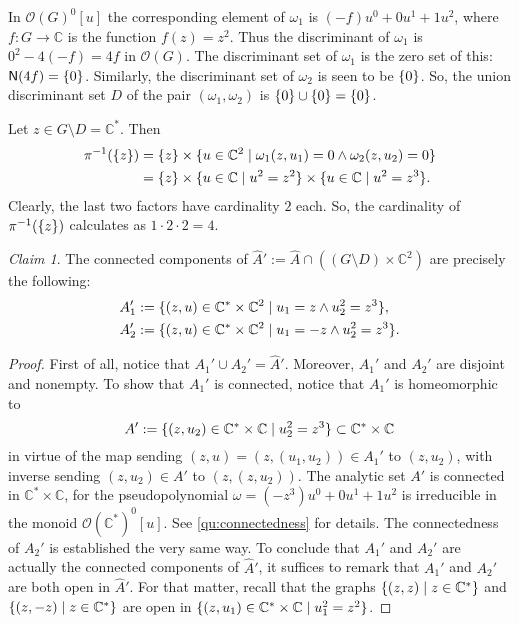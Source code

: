 \documentclass[a4paper]{amsart}
\newcommand{\C}{\mathbb{C}}
\newcommand{\Zero}[1]{\mathsf{N}(#1)}
\renewcommand{\O}{\mathcal{O}}
\theoremstyle{remark}
\newtheorem{claim}{Claim}[question]
\numberwithin{equation}{question}
\DeclarePairedDelimiter\set{\{}{\}}
\begin{document}
\begin{solution}%
\begin{solenum}
\item In $\O(G)^0[u]$ the corresponding element of $\omega_1$ is $(-f)u^0 + 0u^1 + 1u^2$, where $f \colon G \to \C$ is the function $f(z) = z^2$. Thus the discriminant of $\omega_1$ is $0^2 - 4(-f) = 4f$ in $\O(G)$. The discriminant set of $\omega_1$ is the zero set of this: $\Zero{4f} = \set0$. Similarly, the discriminant set of $\omega_2$ is seen to be $\set0$. So, the union discriminant set $D$ of the pair $(\omega_1,\omega_2)$ is $\set0 \cup \set0 = \set0$.

\item Let $z \in G \setminus D = \C^*$. Then
\begin{align*}
\pi^{-1}(\set z) &= \set z \times \set{u \in \C^2 \mid \omega_1(z,u_1) = 0 \land \omega_2(z,u_2) = 0} \\
&= \set z \times \set{u \in \C \mid u^2 = z^2} \times \set{u \in \C \mid u^2 = z^3}.
\end{align*}
Clearly, the last two factors have cardinality $2$ each. So, the cardinality of $\pi^{-1}(\set z)$ calculates as $1 \cdot 2 \cdot 2 = 4$.

\item \begin{claim} The connected components of $\hat A' := \hat A \cap ((G \setminus D) \times \C^2)$ are precisely the following:
\begin{align*}
A_1' &:= \set{(z,u) \in \C^* \times \C^2 \mid u_1 = z \land u_2^2 = z^3}, \\
A_2' &:= \set{(z,u) \in \C^* \times \C^2 \mid u_1 = -z \land u_2^2 = z^3}.
\end{align*}\end{claim}

\begin{proof}
First of all, notice that $A_1' \cup A_2' = \hat A'$. Moreover, $A_1'$ and $A_2'$ are disjoint and nonempty. To show that $A_1'$ is connected, notice that $A_1'$ is homeomorphic to
\[
A' := \set{(z,u_2) \in \C^* \times \C \mid u_2^2 = z^3} \subset \C^* \times \C
\]
in virtue of the map sending $(z,u) = (z,(u_1,u_2)) \in A_1'$ to $(z,u_2)$, with inverse sending $(z,u_2) \in A'$ to $(z,(z,u_2))$. The analytic set $A'$ is connected in $\C^* \times \C$, for the pseudopolynomial $\omega = (-z^3)u^0 + 0u^1 + 1u^2$ is irreducible in the monoid $\O(\C^*)^0[u]$. See \cref{qu:connectedness} for details. The connectedness of $A_2'$ is established the very same way. To conclude that $A_1'$ and $A_2'$ are actually the connected components of $\hat A'$, it suffices to remark that $A_1'$ and $A_2'$ are both open in $\hat A'$. For that matter, recall that the graphs $\set{(z,z) \mid z \in \C^*}$ and $\set{(z,-z) \mid z \in \C^*}$ are open in $\set{(z,u_1) \in \C^* \times \C \mid u_1^2 = z^2}$.
\end{proof}


\end{solenum}
\end{solution}
\end{document}
